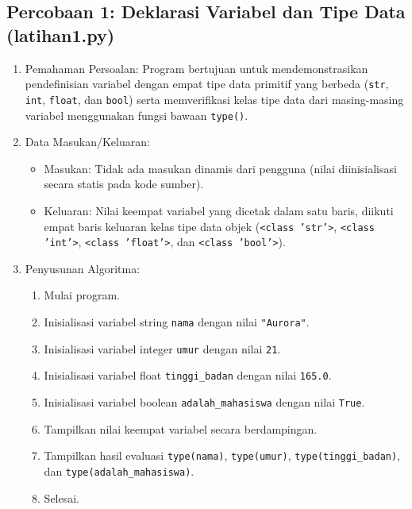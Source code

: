 \documentclass[12pt,a4paper]{article}
\begin{document}
\subsection{Percobaan 1: Deklarasi Variabel dan Tipe Data (latihan1.py)}
\begin{enumerate}
    \item Pemahaman Persoalan: Program bertujuan untuk mendemonstrasikan pendefinisian variabel dengan empat tipe data primitif yang berbeda (\texttt{str}, \texttt{int}, \texttt{float}, dan \texttt{bool}) serta memverifikasi kelas tipe data dari masing-masing variabel menggunakan fungsi bawaan \texttt{type()}.
    \item Data Masukan/Keluaran:
    \begin{itemize}
        \item Masukan: Tidak ada masukan dinamis dari pengguna (nilai diinisialisasi secara statis pada kode sumber).
        \item Keluaran: Nilai keempat variabel yang dicetak dalam satu baris, diikuti empat baris keluaran kelas tipe data objek (\texttt{<class 'str'>}, \texttt{<class 'int'>}, \texttt{<class 'float'>}, dan \texttt{<class 'bool'>}).
    \end{itemize}
    \item Penyusunan Algoritma:
    \begin{enumerate}[label=\alph*.]
        \item Mulai program.
        \item Inisialisasi variabel string \texttt{nama} dengan nilai \texttt{"Aurora"}.
        \item Inisialisasi variabel integer \texttt{umur} dengan nilai \texttt{21}.
        \item Inisialisasi variabel float \texttt{tinggi\_badan} dengan nilai \texttt{165.0}.
        \item Inisialisasi variabel boolean \texttt{adalah\_mahasiswa} dengan nilai \texttt{True}.
        \item Tampilkan nilai keempat variabel secara berdampingan.
        \item Tampilkan hasil evaluasi \texttt{type(nama)}, \texttt{type(umur)}, \texttt{type(tinggi\_badan)}, dan \texttt{type(adalah\_mahasiswa)}.
        \item Selesai.
    \end{enumerate}
\end{enumerate}
\end{document}
